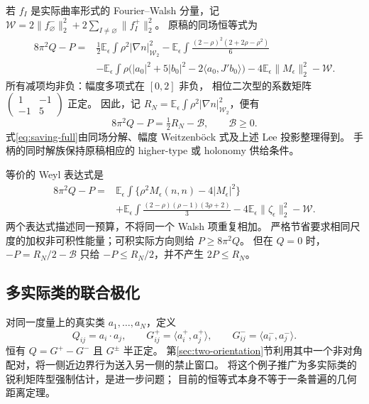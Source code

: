 \documentclass[UTF8,11pt,a4paper,fontset=none]{ctexart}
\numberwithin{equation}{section}
\theoremstyle{definition}
\theoremstyle{remark}\newtheorem{remark}[theorem]{说明}
\begin{document}
若 $f_I$ 是实际曲率形式的 Fourier--Walsh 分量，记
$\mathcal W=2\|f_\varnothing^-\|_2^2+2\sum_{I\ne\varnothing}\|f_I^+\|_2^2$。
原稿的同场恒等式为
\begin{equation}\label{eq:saving-full}
\begin{split}
8\pi^2Q-P={}&\frac12\mathbb E_\epsilon\int\rho^2|\nabla n|_{\mathcal W_2}^2
-\mathbb E_\epsilon\int\frac{(2-\rho)^2(2+2\rho-\rho^2)}6\\
&-\mathbb E_\epsilon\int\rho\bigl(|a_0|^2+5|b_0|^2-2\langle a_0,J'b_0\rangle\bigr)
-4\mathbb E_\epsilon\|M_\epsilon\|_2^2-\mathcal W.
\end{split}
\end{equation}
所有减项均非负：幅度多项式在 $[0,2]$ 非负，
相位二次型的系数矩阵 $\left(\begin{smallmatrix}1&-1\\-1&5\end{smallmatrix}\right)$ 正定。
因此，记 $R_N=\mathbb E_\epsilon\int\rho^2|\nabla n|_{\mathcal W_2}^2$，便有
\begin{equation}\label{eq:saving}
\boxed{8\pi^2Q-P=\tfrac12R_N-\mathcal B,\qquad\mathcal B\ge0.}
\end{equation}
式\eqref{eq:saving-full}由同场分解、幅度 Weitzenböck 式及上述 Lee 投影整理得到\cite{Field}。
手柄的同时解族保持原稿相应的 higher-type 或 holonomy 供给条件。

等价的 Weyl 表达式是
\begin{equation}\label{eq:saving-Weyl}
\begin{split}
8\pi^2Q-P={}&\mathbb E_\epsilon\int
\{\rho^2M_\epsilon(n,n)-4|M_\epsilon|^2\}\\
&+\mathbb E_\epsilon\int\frac{(2-\rho)(\rho-1)(3\rho+2)}3
-4\mathbb E_\epsilon\|\zeta_\epsilon\|_2^2-\mathcal W.
\end{split}
\end{equation}
两个表达式描述同一预算，不将同一个 Walsh 项重复相加。
严格节省要求相同尺度的加权非可积性能量；可积实际方向则给 $P\ge8\pi^2Q$。
但在 $Q=0$ 时，$-P=R_N/2-\mathcal B$ 只给 $-P\le R_N/2$，并不产生 $2P\le R_N$。

\subsection{多实际类的联合极化}
对同一度量上的真实类 $a_1,\ldots,a_N$，定义
\[
Q_{ij}=a_i\cdot a_j,\qquad
G^+_{ij}=\langle a_i^+,a_j^+\rangle,\qquad
G^-_{ij}=\langle a_i^-,a_j^-\rangle.
\]
恒有 $Q=G^+-G^-$ 且 $G^\pm$ 半正定。
第\ref{sec:two-orientation}节利用其中一个非对角配对，将一侧近边界行为送入另一侧的禁止窗口。
将这个例子推广为多实际类的锐利矩阵型强制估计，是进一步问题；
目前的恒等式本身不等于一条普遍的几何距离定理。
\end{document}
